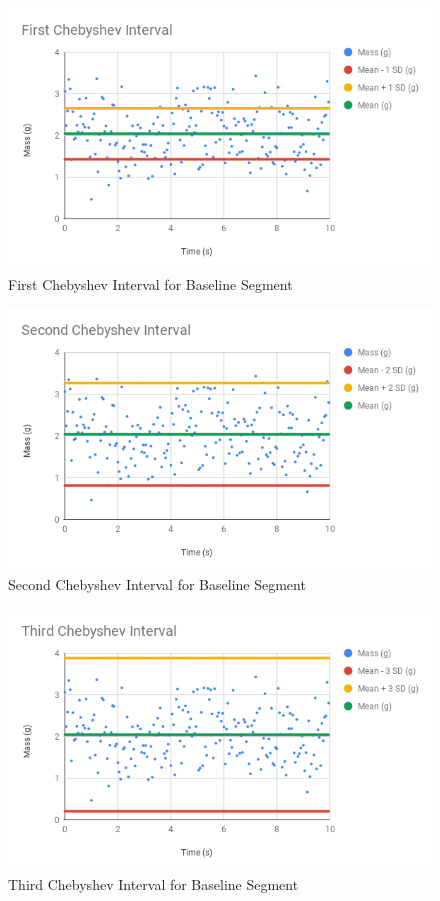 \begin{figure} \label{figure.baseline.chebyshev.1}
    \centering
    \includegraphics[scale=0.71]{image/00-intro/baseline-chebyshev-1.png}
    \caption{First Chebyshev Interval for Baseline Segment}
\end{figure}
\begin{figure} \label{figure.baseline.chebyshev.2}
    \centering
    \includegraphics[scale=0.71]{image/00-intro/baseline-chebyshev-2.png}
    \caption{Second Chebyshev Interval for Baseline Segment}
\end{figure}
\begin{figure} \label{figure.baseline.chebyshev.3}
    \centering
    \includegraphics[scale=0.71]{image/00-intro/baseline-chebyshev-3.png}
    \caption{Third Chebyshev Interval for Baseline Segment}
\end{figure}

